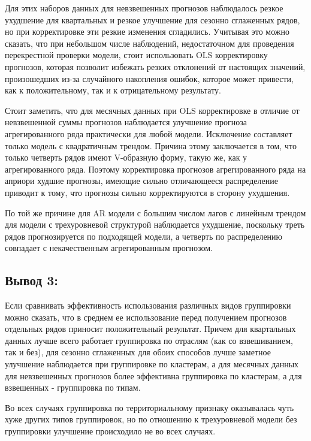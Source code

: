 \documentclass[12pt,a4paper, oneside]{extreport}
\begin{document}
Для этих наборов данных для невзвешенных  прогнозов наблюдалось  резкое  ухудшение для квартальных и резкое улучшение для сезонно сглаженных рядов, но при корректировке эти резкие изменения сгладились. Учитывая это можно сказать, что при небольшом числе наблюдений, недостаточном для проведения перекрестной проверки модели, стоит    использовать OLS корректировку   прогнозов, которая позволит избежать резких отклонений от настоящих значений, произошедших из-за случайного накопления ошибок, которое может привести, как  к положительному, так и к отрицательному результату.

Стоит заметить, что для месячных данных при OLS корректировке в отличие от     невзвешенной суммы прогнозов наблюдается улучшение прогноза агрегированного ряда практически для любой модели. Исключение составляет только модель с квадратичным трендом. Причина этому заключается в том, что только четверть рядов имеют V-образную форму, такую же, как у  агрегированного  ряда.  Поэтому корректировка прогнозов агрегированного ряда на априори худшие  прогнозы, имеющие сильно отличающееся распределение приводит к тому, что прогнозы сильно корректируются в сторону ухудшения. 

По той же причине для AR модели с большим числом лагов с линейным трендом для модели с трехуровневой структурой наблюдается ухудшение, поскольку треть рядов прогнозируется по подходящей модели, а четверть по распределению  совпадает   с некачественным агрегированным прогнозом.  

\subsection*{Вывод 3:}

Если сравнивать эффективность использования различных видов группировки можно сказать, что  в среднем ее использование  перед получением прогнозов отдельных рядов приносит положительный результат. Причем для квартальных данных лучше всего работает группировка по отраслям (как со взвешиванием, так и без), для сезонно сглаженных для обоих способов лучше заметное улучшение наблюдается при группировке по кластерам, а для месячных данных для невзвешенных прогнозов более эффективна группировка по кластерам, а для взвешенных - группировка по типам.


Во всех случаях группировка по территориальному признаку оказывалась чуть хуже других типов группировок, но по отношению к трехуровневой модели без группировки улучшение происходило не во всех случаях.  
\end{document}
